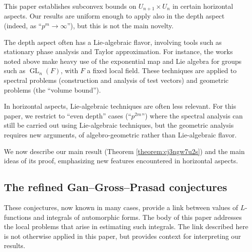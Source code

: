 \documentclass[reqno]{amsart}
\DeclareMathOperator{\GL}{GL}
\theoremstyle{plain} \newtheorem{theorem} {Theorem} \newtheorem{conjecture} {Conjecture} \newtheorem{corollary} [theorem] {Corollary} \newtheorem{proposition} [theorem] {Proposition} \newtheorem{fact} [theorem] {Fact}
\theoremstyle{definition} \newtheorem{definition} [theorem] {Definition}
\theoremstyle{itplain} %
\begin{document}
This paper establishes subconvex bounds on $U_{n +1} \times U_n$ in certain horizontal aspects.  Our results are uniform enough to apply also in the depth aspect (indeed, as ``$p^m \rightarrow \infty$''), but this is not the main novelty.

The depth aspect often has a Lie-algebraic flavor, involving tools such as stationary phase analysis and Taylor approximation.  For instance, the works noted above make heavy use of the exponential map and Lie algebra for groups such as $\GL_n(F)$, with $F$ a fixed local field.  These techniques are applied to spectral problems (construction and analysis of test vectors) and geometric problems (the ``volume bound'').

In horizontal aspects, Lie-algebraic techniques are often less relevant.  For this paper, we restrict to ``even depth'' cases (``$p^{2 m}$'') where the spectral analysis can still be carried out using Lie-algebraic techniques, but the geometric analysis requires new arguments, of algebro-geometric rather than Lie-algebraic flavor.

We now describe our main result (Theorem \ref{theorem:cj3ngw7u2s}) and the main ideas of its proof, emphasizing new features encountered in horizontal aspects.


\subsection{The refined Gan--Gross--Prasad conjectures}\label{sec:cj3siudn3c} 
These conjectures, now known in many cases, provide a link between values of $L$-functions and integrals of automorphic forms.  The body of this paper addresses the local problems that arise in estimating such integrals.  The link described here is not otherwise applied in this paper, but provides context for interpreting our results.
\end{document}
